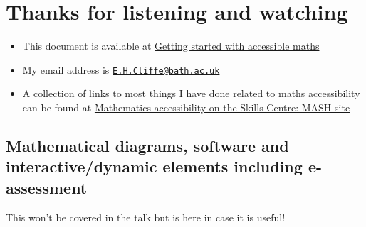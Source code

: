 \documentclass[
  10pt,
  a4paper]{article}
\providecommand{\tightlist}{%
  \setlength{\itemsep}{0pt}\setlength{\parskip}{0pt}}
\begin{document}
\hypertarget{thanks-for-listening-and-watching}{%
\section{Thanks for listening and watching}\label{thanks-for-listening-and-watching}}

\begin{itemize}
\tightlist
\item
  This document is available at \href{https://stem-enable.github.io/Getting-started-with-accessible-maths/index.html}{Getting started with accessible maths}
\item
  My email address is \href{mailto:E.H.Cliffe@bath.ac.uk}{\nolinkurl{E.H.Cliffe@bath.ac.uk}}
\item
  A collection of links to most things I have done related to maths accessibility can be found at \href{https://www.bath.ac.uk/projects/mathematics-accessibility/}{Mathematics accessibility on the Skills Centre: MASH site}
\end{itemize}

\hypertarget{mathematical-diagrams-software-and-interactivedynamic-elements-including-e-assessment}{%
\subsection{Mathematical diagrams, software and interactive/dynamic elements including e-assessment}\label{mathematical-diagrams-software-and-interactivedynamic-elements-including-e-assessment}}

This won't be covered in the talk but is here in case it is useful!
\end{document}
